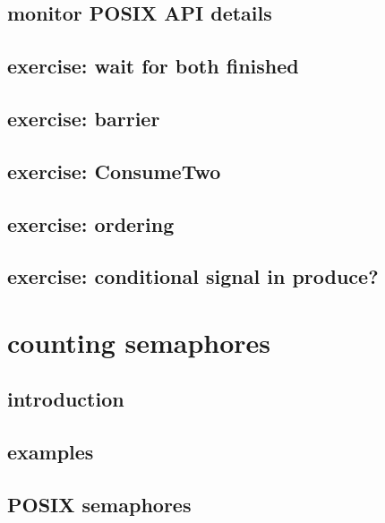 \subsection{monitor POSIX API details}


\subsection{exercise: wait for both finished}


\subsection{exercise: barrier}


\subsection{exercise: ConsumeTwo}


\subsection{exercise: ordering}


\subsection{exercise: conditional signal in produce?}


\section{counting semaphores}

\subsection{introduction}



\subsection{examples}



\subsection{POSIX semaphores}


